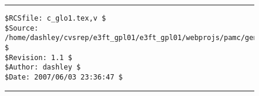 
\noindent\begin{figure}[!b]
\noindent\rule[-0.25in]{\textwidth}{1pt}
\begin{tiny}
\begin{verbatim}
$RCSfile: c_glo1.tex,v $
$Source: /home/dashley/cvsrep/e3ft_gpl01/e3ft_gpl01/webprojs/pamc/gen_a/docs/manual/man_a/c_glo1/c_glo1.tex,v $
$Revision: 1.1 $
$Author: dashley $
$Date: 2007/06/03 23:36:47 $
\end{verbatim}
\end{tiny}
\noindent\rule[0.25in]{\textwidth}{1pt}
\end{figure}

%
